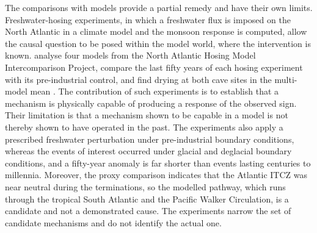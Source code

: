 \documentclass[11pt]{article}
\theoremstyle{definition}
\begin{document}
The comparisons with models provide a partial remedy and have their own limits. Freshwater-hosing experiments, in which a freshwater flux is imposed on the North Atlantic in a climate model and the monsoon response is computed, allow the causal question to be posed within the model world, where the intervention is known. \citeauthor{olson2026} analyse four models from the North Atlantic Hosing Model Intercomparison Project, compare the last fifty years of each hosing experiment with its pre-industrial control, and find drying at both cave sites in the multi-model mean \citep{jackson2023,benyami2024}. The contribution of such experiments is to establish that a mechanism is physically capable of producing a response of the observed sign. Their limitation is that a mechanism shown to be capable in a model is not thereby shown to have operated in the past. The experiments also apply a prescribed freshwater perturbation under pre-industrial boundary conditions, whereas the events of interest occurred under glacial and deglacial boundary conditions, and a fifty-year anomaly is far shorter than events lasting centuries to millennia. Moreover, the proxy comparison indicates that the Atlantic ITCZ was near neutral during the terminations, so the modelled pathway, which runs through the tropical South Atlantic and the Pacific Walker Circulation, is a candidate and not a demonstrated cause. The experiments narrow the set of candidate mechanisms and do not identify the actual one.
\end{document}

